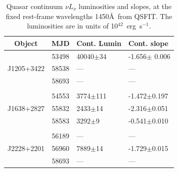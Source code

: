 \documentclass[a4paper,fleqn,usenatbib]{mnras}
\begin{document}
\begin{table}
  \begin{centering}
    \begin{tabular}{c c l l}
      \hline
      \hline
      Object             & MJD      & Cont. Lumin        &  Cont. slope \\
      \hline
                             & 53498   &  40040$\pm$34  & -1.656$\pm$ 0.006 \\
      J1205+3422    & 58538   &   ---                   &  ---     \\
                             & 58693   &   ---                    &  ---     \\
                             &              &                             & \\
                             & 54553   &  3774$\pm$111   &  -1.472$\pm$0.197   \\
      J1638+2827    & 55832  &  2433$\pm$14     &  -2.316$\pm$0.051  \\  
                             & 58583   &  3292$\pm$9       &    -0.541$\pm$0.010 \\
                             &              &                             &\\
                            & 56189    &  ---                      &  ---     \\
    J2228+2201     & 56960   &  7889$\pm$14      &  -1.729$\pm$0.015     \\
                            & 58693   &  ---                       &  ---     \\
    \hline
    \hline
  \end{tabular}
  \caption{Quasar continuum $\nu L_{\nu}$ luminosities and slopes, at
the fixed rest-frame wavelengths 1450\AA\ from QSFIT.  The
luminosities are in units of 10$^{42}$~erg~s$^{-1}$.}
  \label{tab:Baldwin}
  \end{centering}
\end{table}
\end{document}
